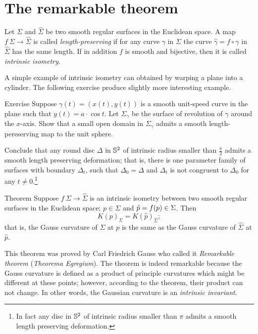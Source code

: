 \section{The remarkable theorem}

Let $\Sigma$ and $\hat{\Sigma}$ be two smooth regular surfaces in the Euclidean space.
A map $f\:\Sigma\to \hat{\Sigma}$ is called  \emph{length-preserving} if for any curve $\gamma$ in $\Sigma$ the curve $\hat\gamma=f\circ\gamma$ in $\hat{\Sigma}$ has the same length. %
If in addition $f$ is smooth and bijective, then it is called \emph{intrinsic isometry}. 

A simple example of intrinsic isometry can obtained by warping a plane into a cylinder.
The following exercise produce slightly more interesting example.


\begin{thm}{Exercise}\label{ex:deformation}
Suppose $\gamma(t)=(x(t),y(t))$ is a smooth unit-speed curve in the plane such that $y(t)=a\cdot \cos t$.
Let $\Sigma_\gamma$ be the surface of revolution of $\gamma$ around the $x$-axis.
Show that a small open domain in $\Sigma_\gamma$ admits a smooth length-pereserving map to the unit sphere.

Conclude that any round disc $\Delta$ in $\mathbb{S}^2$ of intrinsic radius smaller than $\tfrac\pi2$ admits a smooth length preserving deformation; that is, there is one parameter family of surfaces with boundary $\Delta_t$, such that $\Delta_0=\Delta$ and $\Delta_t$ is not congruent to $\Delta_0$ for any $t\ne0$.\footnote{In fact any disc in $\mathbb{S}^2$ of intrinsic radius smaller than $\pi$ admits a smooth length preserving deformation. %
}
\end{thm}


\begin{thm}{Theorem}\label{thm:remarkable}
Suppose $f\:\Sigma\to \hat{\Sigma}$ is an intrinsic isometry between two smooth regular surfaces in  the Euclidean space; $p\in \Sigma$ and $\hat p\z=f(p)\in \Sigma$.
Then 
\[K(p)_{\Sigma}=K(\hat p)_{\hat{\Sigma}};\]
that is, the Gauss curvature of $\Sigma$ at $p$ is the same as the Gauss curvature of $\hat{\Sigma}$ at $\hat p$.
\end{thm}

This theorem was proved by Carl Friedrich Gauss \cite{gauss} who called it \emph{Remarkable theorem} (\emph{Theorema Egregium}).
The theorem is indeed remarkable because the Gauss curvature is defined as a product of principle curvatures which might be different at these points; however, according to the theorem, their product can not change.
In other words, the Gaussian curvature is an {}\emph{intrinsic invariant}.

